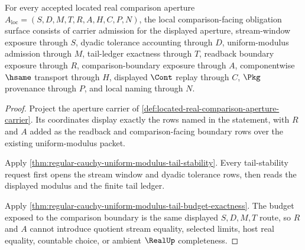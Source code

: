 \begin{theorem}
\label{thm:located-real-comparison-aperture-namecert-obligations}
For every accepted located real comparison aperture
$A_{\mathrm{loc}}=(S,D,M,T,R,A,H,C,P,N)$, the local comparison-facing obligation surface consists of carrier admission for the displayed aperture, stream-window exposure through $S$, dyadic tolerance accounting through $D$, uniform-modulus admission through $M$, tail-ledger exactness through $T$, readback boundary exposure through $R$, comparison-boundary exposure through $A$, componentwise $\hsame$ transport through $H$, displayed $\Cont$ replay through $C$, $\Pkg$ provenance through $P$, and local naming through $N$.
\end{theorem}
\begin{proof}
Project the aperture carrier of \autoref{def:located-real-comparison-aperture-carrier}. Its coordinates display exactly the rows named in the statement, with $R$ and $A$ added as the readback and comparison-facing boundary rows over the existing uniform-modulus packet.

Apply \autoref{thm:regular-cauchy-uniform-modulus-tail-stability}. Every tail-stability request first opens the stream window and dyadic tolerance rows, then reads the displayed modulus and the finite tail ledger.

Apply \autoref{thm:regular-cauchy-uniform-modulus-tail-budget-exactness}. The budget exposed to the comparison boundary is the same displayed $S,D,M,T$ route, so $R$ and $A$ cannot introduce quotient stream equality, selected limits, host real equality, countable choice, or ambient $\RealUp$ completeness.
\end{proof}

